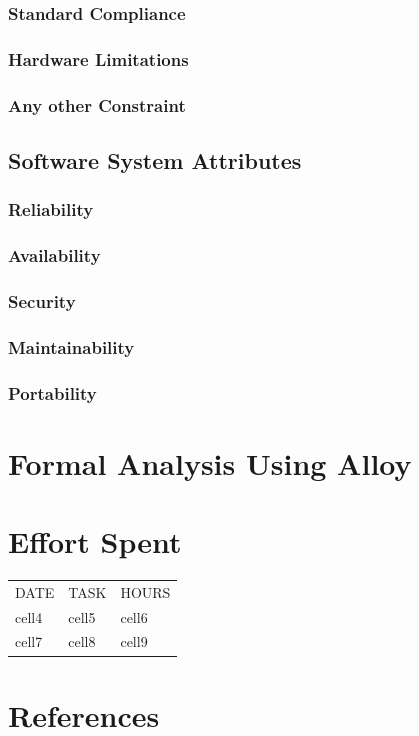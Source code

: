 \documentclass[12pt]{article}
\begin{document}
\subsubsection{Standard Compliance}
\subsubsection{Hardware Limitations}
\subsubsection{Any other Constraint}

\subsection{Software System Attributes}
\subsubsection{Reliability}
\subsubsection{Availability}
\subsubsection{Security}
\subsubsection{Maintainability}
\subsubsection{Portability}

\section{Formal Analysis Using Alloy}

\section{Effort Spent}

\begin{center}
\begin{tabular}{ |l|l|l| } 
 \hline
 DATE & TASK & HOURS \\ 
 cell4 & cell5 & cell6 \\ 
 cell7 & cell8 & cell9 \\ 
 \hline
\end{tabular}
\end{center}

\section{References}
\end{document}
